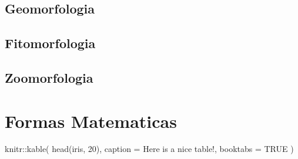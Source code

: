 \documentclass[
  16pt,
]{krantz}
\newenvironment{Shaded}{\begin{snugshade}}{\end{snugshade}}
\newcommand{\AttributeTok}[1]{\textcolor[rgb]{0.77,0.63,0.00}{#1}}
\newcommand{\ConstantTok}[1]{\textcolor[rgb]{0.00,0.00,0.00}{#1}}
\newcommand{\DecValTok}[1]{\textcolor[rgb]{0.00,0.00,0.81}{#1}}
\newcommand{\FunctionTok}[1]{\textcolor[rgb]{0.00,0.00,0.00}{#1}}
\newcommand{\NormalTok}[1]{#1}
\newcommand{\SpecialCharTok}[1]{\textcolor[rgb]{0.00,0.00,0.00}{#1}}
\newcommand{\StringTok}[1]{\textcolor[rgb]{0.31,0.60,0.02}{#1}}
\theoremstyle{definition}
\theoremstyle{definition}
\theoremstyle{definition}
\theoremstyle{definition}
\theoremstyle{remark}
\begin{document}
\hypertarget{geomorfologia}{%
\section{Geomorfologia}\label{geomorfologia}}

\hypertarget{fitomorfologia}{%
\section{Fitomorfologia}\label{fitomorfologia}}

\hypertarget{zoomorfologia}{%
\section{Zoomorfologia}\label{zoomorfologia}}

\hypertarget{formas-matematicas}{%
\chapter{Formas Matematicas}\label{formas-matematicas}}

\begin{Shaded}
\begin{Highlighting}[]
\NormalTok{knitr}\SpecialCharTok{::}\FunctionTok{kable}\NormalTok{(}
  \FunctionTok{head}\NormalTok{(iris, }\DecValTok{20}\NormalTok{), }\AttributeTok{caption =} \StringTok{\textquotesingle{}Here is a nice table!\textquotesingle{}}\NormalTok{,}
  \AttributeTok{booktabs =} \ConstantTok{TRUE}
\NormalTok{)}
\end{Highlighting}
\end{Shaded}
\end{document}
